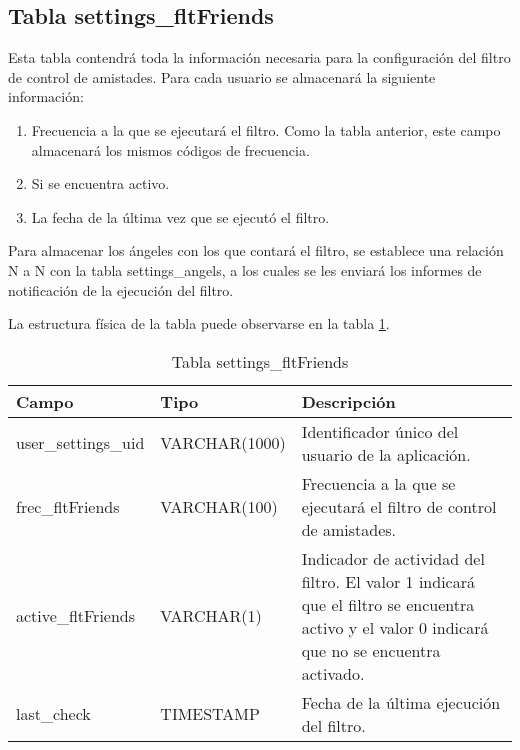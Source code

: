 \subsection{Tabla settings\_fltFriends}
Esta tabla contendrá toda la información necesaria para la configuración del filtro de control de amistades. Para cada usuario se almacenará la siguiente información:
\begin{enumerate}
\item Frecuencia a la que se ejecutará el filtro. Como la tabla anterior, este campo almacenará los mismos códigos de frecuencia.
\item Si se encuentra activo.
\item La fecha de la última vez que se ejecutó el filtro.
\end{enumerate}
Para almacenar los ángeles con los que contará el filtro, se establece una relación N a N con la tabla settings\_angels, a los cuales se les enviará los informes de notificación de la ejecución del filtro.
\bigskip
\par
La estructura física de la tabla puede observarse en la tabla \ref{tabSettingsFltFriends}.
\begin{table}
\begin{center}
\begin{tabular}[c]{| l | l | p{60mm} |}\hline
\textbf{Campo}&\textbf{Tipo}&\textbf{Descripción} \\ \hline
user\_settings\_uid & VARCHAR(1000) & Identificador único del usuario de la aplicación. \\ \hline
frec\_fltFriends & VARCHAR(100) & Frecuencia a la que se ejecutará el filtro de control de amistades. \\ \hline
active\_fltFriends & VARCHAR(1) & Indicador de actividad del filtro. El valor 1 indicará que el filtro se encuentra activo y el valor 0 indicará que no se encuentra activado. \\ \hline
last\_check & TIMESTAMP & Fecha de la última ejecución del filtro. \\ \hline
\end{tabular}
\end{center}
\caption{Tabla settings\_fltFriends} \label{tabSettingsFltFriends}
\end{table}

